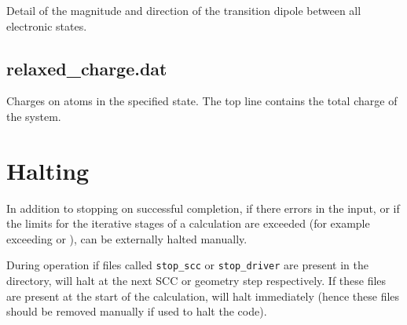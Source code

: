 Detail of the magnitude and direction of the transition dipole between all electronic states.

\subsection{relaxed\_charge.dat}

Charges on atoms in the specified state. The top line contains the total charge
of the system.

\section{Halting \dftbp{}}
\label{sec:dftbp.HaltFiles}

In addition to stopping on successful completion, if there errors in the input,
or if the limits for the iterative stages of a calculation are exceeded (for
example exceeding  or ), \dftbp{} can be
externally halted manually.

During operation if files called \texttt{stop\_scc} or
\texttt{stop\_driver} are present in the directory, \dftbp{}
will halt at the next SCC or geometry step respectively. If these files are
present at the start of the calculation, \dftbp{} will halt immediately (hence
these files should be removed manually if used to halt the code).

